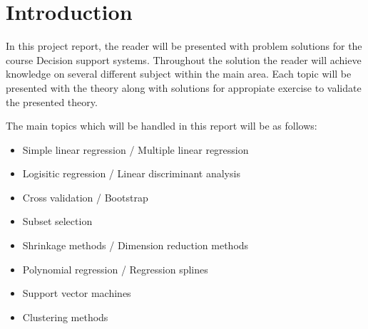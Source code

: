\graphicspath{{Chapters/Indledning/}}

\chapter{Introduction}

In this project report, the reader will be presented with problem solutions for the course Decision support systems. Throughout the solution the reader will achieve knowledge on several different subject within the main area. Each topic will be presented with the theory along with solutions for appropiate exercise to validate the presented theory. 

The main topics which will be handled in this report will be as follows:

\begin{itemize}
	\item Simple linear regression / Multiple linear regression
	\item Logisitic regression / Linear discriminant analysis
	\item Cross validation / Bootstrap
	\item Subset selection 
	\item Shrinkage methods / Dimension reduction methods 
	\item Polynomial regression / Regression splines
	\item Support vector machines
	\item Clustering methods
\end{itemize}